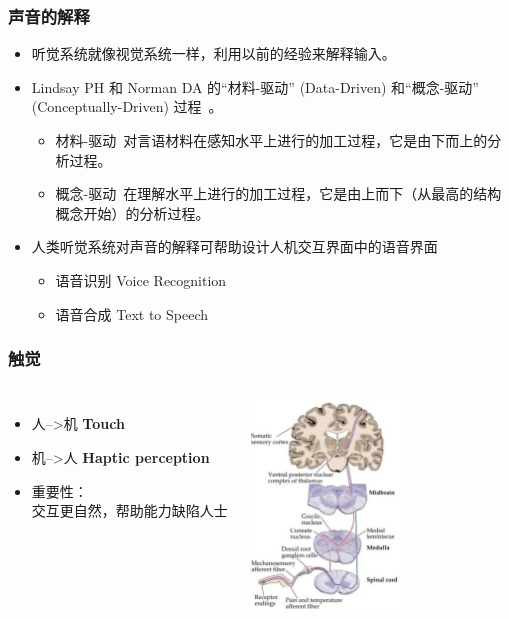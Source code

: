 \documentclass{beamer}
\begin{document}
\begin{frame}
	\frametitle{声音的解释}
	\beamertemplatetransparentcovereddynamicmedium 
	\begin{itemize}
		\item 听觉系统就像视觉系统一样，利用以前的经验来解释输入。\pause
		\item Lindsay PH 和 Norman DA 的``材料-驱动'' (Data-Driven) 和``概念-驱动'' (Conceptually-Driven) 过程~\cite{Langley198131}。
		\begin{itemize}
			\item 材料-驱动~{\tiny 对言语材料在感知水平上进行的加工过程，它是由下而上的分析过程。}
			\item 概念-驱动~{\tiny 在理解水平上进行的加工过程，它是由上而下（从最高的结构概念开始）的分析过程。}
		\end{itemize}\pause
		\item 人类听觉系统对声音的解释可帮助设计人机交互界面中的语音界面
		\begin{itemize}
			\item 语音识别 Voice Recognition
			\item 语音合成 Text to Speech
		\end{itemize}
	\end{itemize}
\end{frame}

\begin{frame}
	\frametitle{触觉}
	\beamertemplatetransparentcovereddynamicmedium 
	\begin{columns}
	\column{6cm}
	\begin{itemize}[<+->]
		\item 人-->机 \textbf{Touch}
		\item 机-->人 \textbf{Haptic perception}
		\item 重要性：\\{\small 交互更自然，帮助能力缺陷人士}
	\end{itemize}
	\column{4cm}
	\includegraphics[width=4cm]{images/skin-receptor-path.png}
	\end{columns}
\end{frame}
\end{document}
